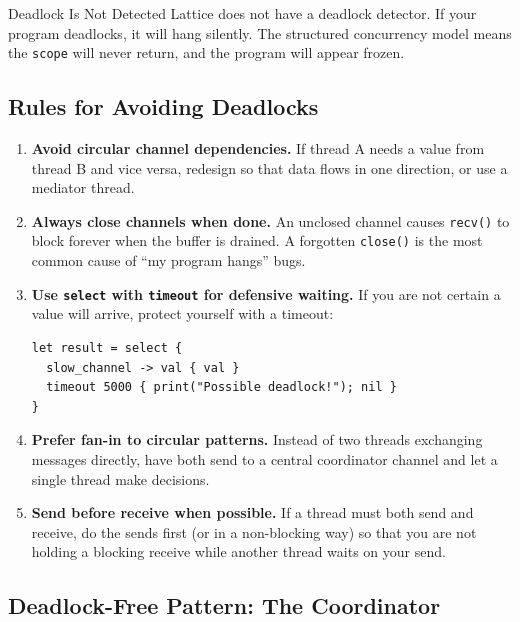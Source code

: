 \begin{warnbox}{Deadlock Is Not Detected}
Lattice does not have a deadlock detector.
If your program deadlocks, it will hang silently.
The structured concurrency model means the \lstinline|scope| will never return, and the program will appear frozen.
\end{warnbox}

\subsection{Rules for Avoiding Deadlocks}

\begin{enumerate}
  \item \textbf{Avoid circular channel dependencies.} If thread A needs a value from thread B and vice versa, redesign so that data flows in one direction, or use a mediator thread.

  \item \textbf{Always close channels when done.} An unclosed channel causes \lstinline|recv()| to block forever when the buffer is drained. A forgotten \lstinline|close()| is the most common cause of ``my program hangs'' bugs.

  \item \textbf{Use \lstinline|select| with \lstinline|timeout| for defensive waiting.} If you are not certain a value will arrive, protect yourself with a timeout:

\begin{lstlisting}[language=Lattice, caption={Timeout as deadlock prevention}]
let result = select {
  slow_channel -> val { val }
  timeout 5000 { print("Possible deadlock!"); nil }
}
\end{lstlisting}

  \item \textbf{Prefer fan-in to circular patterns.} Instead of two threads exchanging messages directly, have both send to a central coordinator channel and let a single thread make decisions.

  \item \textbf{Send before receive when possible.} If a thread must both send and receive, do the sends first (or in a non-blocking way) so that you are not holding a blocking receive while another thread waits on your send.
\end{enumerate}

\subsection{Deadlock-Free Pattern: The Coordinator}

